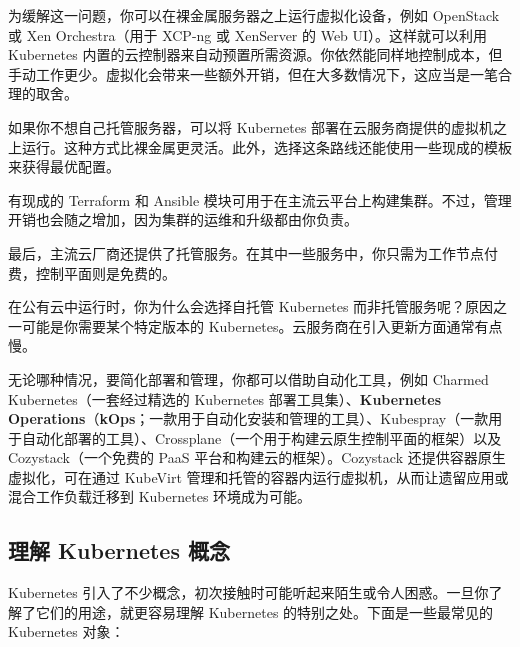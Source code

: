 为缓解这一问题，你可以在裸金属服务器之上运行虚拟化设备，例如 OpenStack 或 Xen Orchestra（用于 XCP-ng 或 XenServer 的 Web UI）。这样就可以利用 Kubernetes 内置的云控制器来自动预置所需资源。你依然能同样地控制成本，但手动工作更少。虚拟化会带来一些额外开销，但在大多数情况下，这应当是一笔合理的取舍。

如果你不想自己托管服务器，可以将 Kubernetes 部署在云服务商提供的虚拟机之上运行。这种方式比裸金属更灵活。此外，选择这条路线还能使用一些现成的模板来获得最优配置。

有现成的 Terraform 和 Ansible 模块可用于在主流云平台上构建集群。不过，管理开销也会随之增加，因为集群的运维和升级都由你负责。

最后，主流云厂商还提供了托管服务。在其中一些服务中，你只需为工作节点付费，控制平面则是免费的。

在公有云中运行时，你为什么会选择自托管 Kubernetes 而非托管服务呢？原因之一可能是你需要某个特定版本的 Kubernetes。云服务商在引入更新方面通常有点慢。

\label{idx:1955}
\label{idx:1956}
无论哪种情况，要简化部署和管理，你都可以借助自动化工具，例如 Charmed Kubernetes（一套经过精选的 Kubernetes 部署工具集）、\textbf{Kubernetes Operations}（\textbf{kOps}；一款用于自动化安装和管理的工具）、Kubespray（一款用于自动化部署的工具）、Crossplane（一个用于构建云原生控制平面的框架）以及 Cozystack（一个免费的 PaaS 平台和构建云的框架）。Cozystack 还提供容器原生虚拟化，可在通过 KubeVirt 管理和托管的容器内运行虚拟机，从而让遗留应用或混合工作负载迁移到 Kubernetes 环境成为可能。

\subsection{理解 Kubernetes 概念}

Kubernetes 引入了不少概念，初次接触时可能听起来陌生或令人困惑。一旦你了解了它们的用途，就更容易理解 Kubernetes 的特别之处。下面是一些最常见的 Kubernetes 对象：

